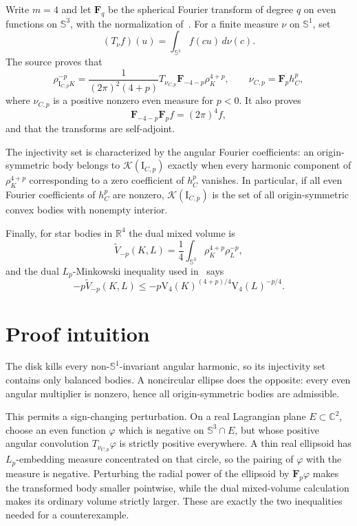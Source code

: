\documentclass[11pt]{article}
\newcommand{\C}{\mathbb C}
\newcommand{\R}{\mathbb R}
\newcommand{\Sph}{\mathbb S}
\newcommand{\Vol}{\mathrm V}
\newcommand{\F}{\mathbf F}
\newcommand{\I}{\mathrm I}
\newcommand{\Kc}{\mathcal K}
\begin{document}
Write $m=4$ and let $\F_q$ be the spherical Fourier transform of degree $q$
on even functions on $\Sph^3$, with the normalization of~\cite{EH}.  For a
finite measure $\nu$ on $\Sph^1$, set
\[
 (T_\nu f)(u)=\int_{\Sph^1}f(cu)\,d\nu(c).
\]
The source proves that
\begin{equation}\label{eq:source-transform}
 \rho_{\I_{C,p}K}^{-p}
 =\frac{1}{(2\pi)^2(4+p)}
 T_{\nu_{C,p}}\F_{-4-p}\rho_K^{4+p},
 \qquad \nu_{C,p}=\F_p h_C^p,
\end{equation}
where $\nu_{C,p}$ is a positive nonzero even measure for $p<0$.  It also
proves
\begin{equation}\label{eq:inverse}
 \F_{-4-p}\F_p f=(2\pi)^4f,
\end{equation}
and that the transforms are self-adjoint.

The injectivity set is characterized by the angular Fourier coefficients:
an origin-symmetric body belongs to $\Kc(\I_{C,p})$ exactly when every
harmonic component of $\rho_K^{4+p}$ corresponding to a zero coefficient of
$h_C^p$ vanishes.  In particular, if all even Fourier coefficients of
$h_C^p$ are nonzero, $\Kc(\I_{C,p})$ is the set of all origin-symmetric
convex bodies with nonempty interior.

Finally, for star bodies in $\R^4$ the dual mixed volume is
\[
 \widetilde V_{-p}(K,L)
 =\frac14\int_{\Sph^3}\rho_K^{4+p}\rho_L^{-p},
\]
and the dual $L_p$-Minkowski inequality used in~\cite{EH} says
\begin{equation}\label{eq:dual-minkowski}
 -p\widetilde V_{-p}(K,L)
 \le -p\Vol_4(K)^{(4+p)/4}\Vol_4(L)^{-p/4}.
\end{equation}

\section{Proof intuition}

The disk kills every non-$\Sph^1$-invariant angular harmonic, so its
injectivity set contains only balanced bodies.  A noncircular ellipse does the
opposite: every even angular multiplier is nonzero, hence all
origin-symmetric bodies are admissible.

This permits a sign-changing perturbation.  On a real Lagrangian plane
$E\subset\C^2$, choose an even function $\varphi$ which is negative on
$\Sph^3\cap E$, but whose positive angular convolution
$T_{\nu_{C,p}}\varphi$ is strictly positive everywhere.  A thin real
ellipsoid has $L_p$-embedding measure concentrated on that circle, so the
pairing of $\varphi$ with the measure is negative.  Perturbing the radial
power of the ellipsoid by $\F_p\varphi$ makes the transformed body smaller
pointwise, while the dual mixed-volume calculation makes its ordinary volume
strictly larger.  These are exactly the two inequalities needed for a
counterexample.
\end{document}
